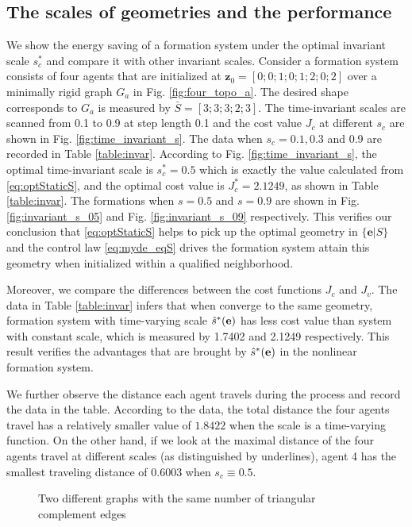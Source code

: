 \documentclass[times]{rncauth}
\newcommand{\be}{\ensuremath \mathbf{e}}
\begin{document}
\subsection{The scales of geometries and the performance}
We show the energy saving of a formation system under the optimal
invariant scale $s_c^*$ and  compare it with other invariant scales.
Consider a formation system consists of four agents that are
initialized at $\mathbf{z}_0=[0;0;1;0;1;2;0;2]$ over a minimally
rigid graph $G_a$ in Fig. \ref{fig:four_topo_a}. The desired shape
corresponds to $G_a$ is measured by $\bar{S}=[3;3;3;2;3]$. The
time-invariant scales are scanned from 0.1 to 0.9 at step length 0.1
and the cost value $J_c$ at different $s_c$ are shown in Fig.
\ref{fig:time_invariant_s}. The data when $s_c=0.1, 0.3$ and 0.9 are
recorded in Table \ref{table:invar}. According to Fig.
\ref{fig:time_invariant_s}, the optimal time-invariant scale is
$s^*_c=0.5$ which is exactly the value calculated from
\eqref{eq:optStaticS}, and the optimal cost value is $J_c^*=2.1249$,
as shown in Table \ref{table:invar}. The formations when $s=0.5$ and
$s=0.9$ are shown in Fig. \ref{fig:invariant_s_05} and Fig.
\ref{fig:invariant_s_09} respectively. This verifies our conclusion
that \eqref{eq:optStaticS} helps to pick up the optimal geometry in
$\{\mathbf{e}|S\}$ and the control law \eqref{eq:myde_eqS} drives
the formation system attain this geometry when initialized within a
qualified neighborhood.

Moreover, we compare the differences between the cost functions
$J_c$ and $J_v$. The data in Table \ref{table:invar} infers that
when converge to the same geometry, formation system with
time-varying scale $\hat{s}^*(\be)$ has less cost value than system
with constant scale, which is measured by 1.7402 and 2.1249
respectively. This result verifies the advantages that are brought
by $\hat{s}^*(\be)$ in the nonlinear formation system.

We further observe the distance each agent travels during the
process and record the data in the table. According to the data, the
total distance the four agents travel has a relatively smaller value
of $1.8422$ when the scale is a time-varying function. On the other
hand, if we look at the maximal distance of the four agents travel
at different scales (as distinguished by underlines), agent 4 has
the smallest traveling distance of 0.6003 when $s_c\equiv0.5$.
\begin{figure}
\caption{Two different graphs with the same number of triangular
complement edges}\label{fig:four_topo}
\end{figure}
\end{document}
